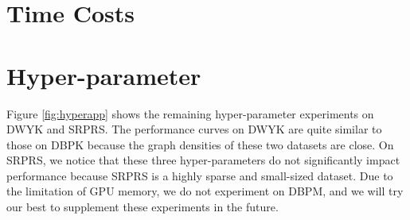 \documentclass[11pt]{article}
\begin{document}
\section{Time Costs}
\begin{table}[h]
\begin{center}
\end{center}
\caption{Time costs of existing EA methods (seconds). Because we do not have enough time and devices to run all these methods by ourselves, these time costs are from the summary \cite{9174835} for reference only.}\label{tabel:timeapp}
\end{table}

\section{Hyper-parameter}
\label{sec:hyperapp}
Figure \ref{fig:hyperapp} shows the remaining hyper-parameter experiments on DWYK and SRPRS.
The performance curves on DWYK are quite similar to those on DBPK because the graph densities of these two datasets are close.
On SRPRS, we notice that these three hyper-parameters do not significantly impact performance because SRPRS is a highly sparse and small-sized dataset.
Due to the limitation of GPU memory, we do not experiment on DBPM, and we will try our best to supplement these experiments in the future.
\end{document}
